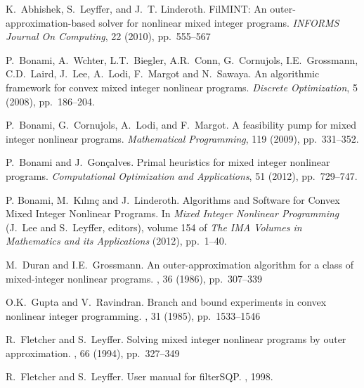 \begin{PageSummary}
\end{PageSummary}
\begin{thebibliography}{10}

 K.~Abhishek, S.~Leyffer, and J.~T. Linderoth. FilMINT: An
  outer-approximation-based solver for nonlinear mixed integer programs.
  {\em INFORMS Journal On Computing}, 22 (2010), pp.~555--567

P.~Bonami, A.~W\auml chter, L.T.~Biegler, A.R.~Conn, G.~Cornu\eacute jols,
I.E.~Grossmann, C.D.~Laird, J.~Lee, A.~Lodi, F.~Margot and
N.~Sawaya.
\newblock An algorithmic framework for convex mixed integer nonlinear programs. {\em Discrete Optimization}, 5 (2008), pp.~186--204.

{P.~Bonami, G.~Cornu\eacute jols, A.~Lodi, and F.~Margot}. {A feasibility
  pump for mixed integer nonlinear programs}. {\em Mathematical Programming}, 119
  (2009), pp.~331--352.

{P.~Bonami and J.~Gon{\c{c}}alves}. {Primal heuristics for mixed
  integer nonlinear programs}. 
  {\em Computational Optimization and Applications}, 51 (2012), pp.~729--747.

P. Bonami, M.~{K{\i}l{\i}n\c{c}} and J.~Linderoth.
Algorithms and Software for Convex Mixed Integer Nonlinear Programs.
In \emph{Mixed Integer Nonlinear Programming} (J.~Lee and S.~Leyffer, editors),
volume 154 of \emph{The IMA Volumes in Mathematics and its Applications} (2012),
pp.~1--40.

M.~Duran and I.E.~Grossmann.
\newblock An outer-approximation algorithm for a class of mixed-integer nonlinear programs.
, 36 (1986), pp.~307--339

O.K.~Gupta and V.~Ravindran.
\newblock Branch and bound experiments in convex nonlinear integer programming.
, 31 (1985), pp.~1533--1546

R.~Fletcher and S.~Leyffer.
\newblock Solving mixed integer nonlinear programs by outer approximation.
, 66 (1994), pp.~327--349

R.~Fletcher and S.~Leyffer.
\newblock User manual for filter{SQP}.
, 1998.


\end{thebibliography}
